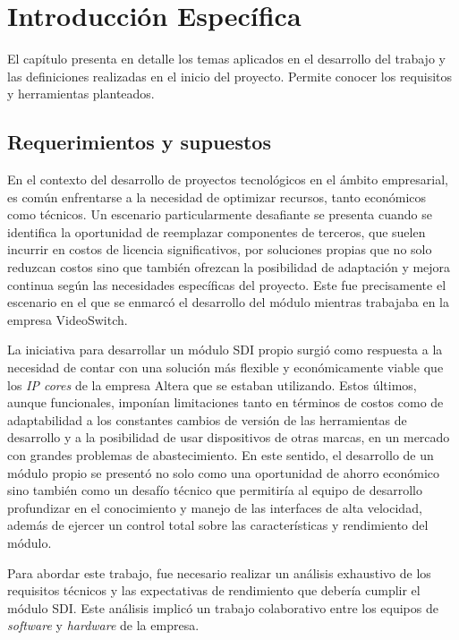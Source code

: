 \chapter{Introducción Específica}\label{Chapter2}

El capítulo presenta en detalle los temas aplicados en el desarrollo del trabajo y
las definiciones realizadas en el inicio del proyecto. Permite conocer los requisitos
y herramientas planteados.

\section{Requerimientos y supuestos}

  En el contexto del desarrollo de proyectos tecnológicos en el ámbito empresarial,
  es común enfrentarse a la necesidad de optimizar recursos, tanto económicos como
  técnicos. Un escenario particularmente desafiante se presenta cuando se
  identifica la oportunidad de reemplazar componentes de terceros, que suelen
  incurrir en costos de licencia significativos, por soluciones propias que no
  solo reduzcan costos sino que también ofrezcan la posibilidad de adaptación y
  mejora continua según las necesidades específicas del proyecto. Este fue
  precisamente el escenario en el que se enmarcó el desarrollo del módulo
  mientras trabajaba en la empresa VideoSwitch.

  La iniciativa para desarrollar un módulo SDI propio surgió como respuesta a la
  necesidad de contar con una solución más flexible y económicamente viable que
  los \textit{IP cores} de la empresa Altera que se estaban utilizando. Estos
  últimos, aunque funcionales, imponían limitaciones tanto en términos de costos
  como de adaptabilidad a los constantes cambios de versión de las herramientas
  de desarrollo y a la posibilidad de usar dispositivos de otras marcas, en un
  mercado con grandes problemas de abastecimiento. En este sentido, el desarrollo
  de un módulo propio se presentó no solo como una oportunidad de ahorro económico
  sino también como un desafío técnico que permitiría al equipo de
  desarrollo profundizar en el conocimiento y manejo de las interfaces de alta
  velocidad, además de ejercer un control total sobre las características y
  rendimiento del módulo.

  Para abordar este trabajo, fue necesario realizar un análisis exhaustivo de
  los requisitos técnicos y las expectativas de rendimiento que debería cumplir
  el módulo SDI\@. Este análisis implicó un trabajo colaborativo entre los
  equipos de \textit{software} y \textit{hardware} de la empresa.

